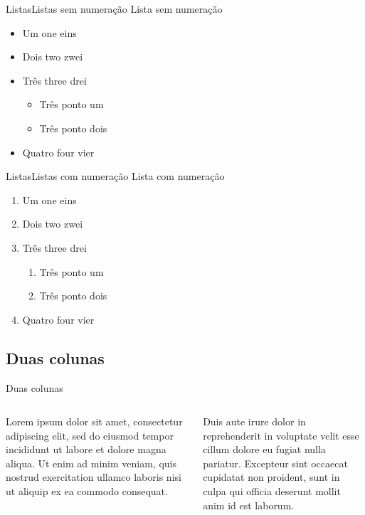 \documentclass[
	brazilian, %
	12pt, %
]{beamer}
\begin{document}
\begin{frame}{Listas}{Listas sem numeração}
	Lista sem numeração
	
	\begin{itemize}
		\item Um one eins
		\item Dois two zwei
		\item Três three drei
			\begin{itemize}
				\item Três ponto um
				\item Três ponto dois
			\end{itemize}
		\item Quatro four vier
	\end{itemize}
\end{frame}

\begin{frame}{Listas}{Listas com numeração}
	Lista com numeração
	
	\begin{enumerate}
		\item Um one eins
		\item Dois two zwei
		\item Três three drei
			\begin{enumerate}
				\item Três ponto um
				\item Três ponto dois
			\end{enumerate}
		\item Quatro four vier
	\end{enumerate}
\end{frame}

\subsection{Duas colunas}

\begin{frame}{Duas colunas}
	\begin{columns}[t]
		\begin{column}{0.4\linewidth}
			Lorem ipsum dolor sit amet, consectetur adipiscing elit, sed do eiusmod tempor incididunt ut labore et dolore magna aliqua. Ut enim ad minim veniam, quis nostrud exercitation ullamco laboris nisi ut aliquip ex ea commodo consequat.
		\end{column}
		\begin{column}{0.6\linewidth}
			Duis aute irure dolor in reprehenderit in voluptate velit esse cillum dolore eu fugiat nulla pariatur. Excepteur sint occaecat cupidatat non proident, sunt in culpa qui officia deserunt mollit anim id est laborum.
		\end{column}
	\end{columns}
\end{frame}
\end{document}
